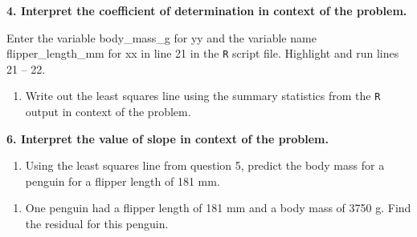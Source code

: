 \documentclass[
]{report}
\newenvironment{Shaded}{\begin{snugshade}}{\end{snugshade}}
\newcommand{\AttributeTok}[1]{\textcolor[rgb]{0.77,0.63,0.00}{#1}}
\newcommand{\CommentTok}[1]{\textcolor[rgb]{0.56,0.35,0.01}{\textit{#1}}}
\newcommand{\FunctionTok}[1]{\textcolor[rgb]{0.00,0.00,0.00}{#1}}
\newcommand{\NormalTok}[1]{#1}
\newcommand{\OtherTok}[1]{\textcolor[rgb]{0.56,0.35,0.01}{#1}}
\newcommand{\SpecialCharTok}[1]{\textcolor[rgb]{0.00,0.00,0.00}{#1}}
\providecommand{\tightlist}{%
  \setlength{\itemsep}{0pt}\setlength{\parskip}{0pt}}
\begin{document}
\vspace{0.5in}

\textbf{4. Interpret the coefficient of determination in context of the problem.}

\vspace{1in}

Enter the variable body\_mass\_g for yy and the variable name flipper\_length\_mm for xx in line 21 in the \texttt{R} script file. Highlight and run lines 21 -- 22.

\begin{Shaded}
\end{Shaded}

\begin{enumerate}
\def\labelenumi{\arabic{enumi}.}
\setcounter{enumi}{4}
\tightlist
\item
  Write out the least squares line using the summary statistics from the \texttt{R} output in context of the problem.
\end{enumerate}

\vspace{.5in}

\textbf{6. Interpret the value of slope in context of the problem.}

\vspace{.8in}

\begin{enumerate}
\def\labelenumi{\arabic{enumi}.}
\setcounter{enumi}{6}
\tightlist
\item
  Using the least squares line from question 5, predict the body mass for a penguin for a flipper length of 181 mm.
\end{enumerate}

\vspace{.6in}

\begin{enumerate}
\def\labelenumi{\arabic{enumi}.}
\setcounter{enumi}{7}
\tightlist
\item
  One penguin had a flipper length of 181 mm and a body mass of 3750 g. Find the residual for this penguin.
\end{enumerate}
\end{document}
